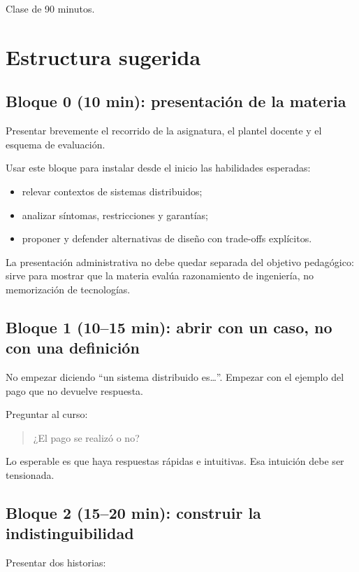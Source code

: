 \documentclass[variant=docente,cover=institutional,mode=screen]{ua-engineering-v6-article}
\begin{document}
Clase de 90 minutos.

\section{Estructura sugerida}\label{sec:estructura-sugerida}

\subsection*{Bloque 0 (10 min): presentación de la materia}

Presentar brevemente el recorrido de la asignatura, el plantel docente y el esquema de evaluación.

Usar este bloque para instalar desde el inicio las habilidades esperadas:

\begin{itemize}
\item relevar contextos de sistemas distribuidos;
\item analizar síntomas, restricciones y garantías;
\item proponer y defender alternativas de diseño con trade-offs explícitos.
\end{itemize}

La presentación administrativa no debe quedar separada del objetivo pedagógico: sirve para mostrar que la materia evalúa razonamiento de ingeniería, no memorización de tecnologías.

\subsection*{Bloque 1 (10--15 min): abrir con un caso, no con una definición}

No empezar diciendo “un sistema distribuido es\ldots”.  
Empezar con el ejemplo del pago que no devuelve respuesta.

Preguntar al curso:

\begin{quote}
¿El pago se realizó o no?
\end{quote}

Lo esperable es que haya respuestas rápidas e intuitivas.
Esa intuición debe ser tensionada.

\subsection*{Bloque 2 (15--20 min): construir la indistinguibilidad}

Presentar dos historias:
\end{document}
